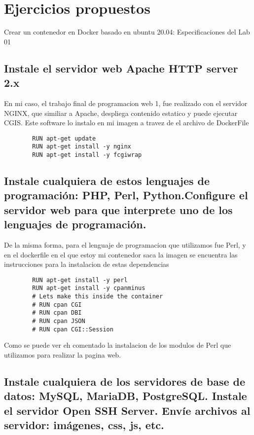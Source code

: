 \documentclass[10pt]{article}
\begin{document}
	
	\section{Ejercicios propuestos}
	Crear un contenedor en Docker basado en ubuntu 20.04:
	Especificaciones del Lab 01 
	
	\subsection*{Instale el servidor web Apache HTTP server 2.x }
	En mi caso, el trabajo final de programacion web 1, fue realizado con el servidor NGINX, que similiar a Apache, despliega contenido estatico y puede ejecutar
	CGIS. Este software lo instalo en mi imagen a travez de el archivo de DockerFile

	\begin{lstlisting}
		RUN apt-get update
		RUN apt-get install -y nginx
		RUN apt-get install -y fcgiwrap
	\end{lstlisting}
	
	\subsection{Instale cualquiera de estos lenguajes de programación: PHP, Perl, Python.\newline Configure el servidor web para que interprete uno de los lenguajes de programación.}
	De la misma forma, para el lenguaje de programacion que utilizamos fue Perl, y en el dockerfile en el que estoy mi contenedor saca la imagen se encuentra las instrucciones para la 
	instalacion de estas dependencias
	
	\begin{lstlisting}
		RUN apt-get install -y perl
		RUN apt-get install -y cpanminus
		# Lets make this inside the container
		# RUN cpan CGI
		# RUN cpan DBI
		# RUN cpan JSON
		# RUN cpan CGI::Session
	\end{lstlisting}

	Como se puede ver eh comentado la instalacion de los modulos de Perl que utilizamos para realizar la pagina web.

	\subsection{Instale cualquiera de los servidores de base de datos: MySQL, MariaDB, PostgreSQL.\newline
	Instale el servidor Open SSH Server. Envíe archivos al servidor: imágenes, css, js, etc.\newline}
\end{document}
